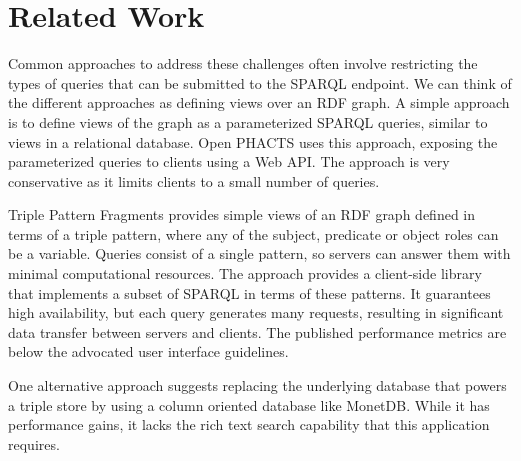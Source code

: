 \vspace{-0.2cm}
\section{Related Work}
\label{sec:related-work}
Common approaches to address these challenges often involve restricting the types of queries that can be submitted to the SPARQL endpoint.
We can think of the different approaches as defining views over an RDF graph.
A simple approach is to define views of the graph as a parameterized SPARQL queries, similar to views in a relational database.
Open PHACTS\cite{Loizou_Angles_Groth_2014} uses this approach, exposing the parameterized queries to clients using a Web API.
The approach is very conservative as it limits clients to a small number of queries.

Triple Pattern Fragments \cite{Verborgh2014} provides simple views of an RDF graph defined in terms of a triple pattern, where any of the subject, predicate or object roles can be a variable.
Queries consist of a single pattern, so servers can answer them with minimal computational resources.
The approach provides a client-side library that implements a subset of SPARQL in terms of these patterns.
It guarantees high availability, but each query generates many requests, resulting in significant data transfer between servers and clients. 
The published performance metrics are below the advocated user interface guidelines. 

One alternative approach suggests replacing the underlying database that powers a triple store by using a column oriented database like MonetDB\cite{Wang_Wang_Du_Feng_2010}.   While it has performance gains, it lacks the rich text search capability that this application requires.